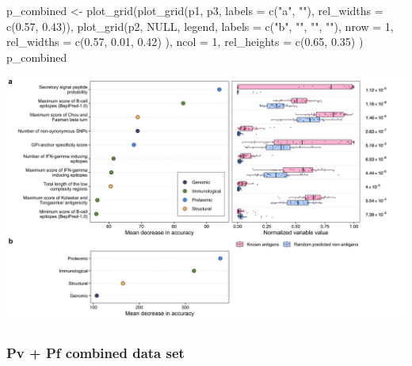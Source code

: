 \documentclass[
  11pt,
  oneside]{book}
\newenvironment{Shaded}{\begin{snugshade}}{\end{snugshade}}
\newcommand{\AttributeTok}[1]{\textcolor[rgb]{0.77,0.63,0.00}{#1}}
\newcommand{\ConstantTok}[1]{\textcolor[rgb]{0.00,0.00,0.00}{#1}}
\newcommand{\DecValTok}[1]{\textcolor[rgb]{0.00,0.00,0.81}{#1}}
\newcommand{\FloatTok}[1]{\textcolor[rgb]{0.00,0.00,0.81}{#1}}
\newcommand{\FunctionTok}[1]{\textcolor[rgb]{0.00,0.00,0.00}{#1}}
\newcommand{\NormalTok}[1]{#1}
\newcommand{\OtherTok}[1]{\textcolor[rgb]{0.56,0.35,0.01}{#1}}
\newcommand{\StringTok}[1]{\textcolor[rgb]{0.31,0.60,0.02}{#1}}
\begin{document}
\begin{Shaded}
\begin{Highlighting}[]
\NormalTok{p\_combined }\OtherTok{\textless{}{-}} \FunctionTok{plot\_grid}\NormalTok{(}\FunctionTok{plot\_grid}\NormalTok{(p1, p3, }\AttributeTok{labels =} \FunctionTok{c}\NormalTok{(}\StringTok{"a"}\NormalTok{, }\StringTok{""}\NormalTok{), }\AttributeTok{rel\_widths =} \FunctionTok{c}\NormalTok{(}\FloatTok{0.57}\NormalTok{, }\FloatTok{0.43}\NormalTok{)),}
  \FunctionTok{plot\_grid}\NormalTok{(p2, }\ConstantTok{NULL}\NormalTok{, legend,}
    \AttributeTok{labels =} \FunctionTok{c}\NormalTok{(}\StringTok{"b"}\NormalTok{, }\StringTok{""}\NormalTok{, }\StringTok{""}\NormalTok{, }\StringTok{""}\NormalTok{),}
    \AttributeTok{nrow =} \DecValTok{1}\NormalTok{, }\AttributeTok{rel\_widths =} \FunctionTok{c}\NormalTok{(}\FloatTok{0.57}\NormalTok{, }\FloatTok{0.01}\NormalTok{, }\FloatTok{0.42}\NormalTok{)}
\NormalTok{  ),}
  \AttributeTok{ncol =} \DecValTok{1}\NormalTok{, }\AttributeTok{rel\_heights =} \FunctionTok{c}\NormalTok{(}\FloatTok{0.65}\NormalTok{, }\FloatTok{0.35}\NormalTok{)}
\NormalTok{)}
\NormalTok{p\_combined}
\end{Highlighting}
\end{Shaded}

\begin{center}\includegraphics[width=1\linewidth]{./figures/Supplementary Fig 9} \end{center}

\hypertarget{pv-pf-combined-data-set-6}{%
\subsubsection{Pv + Pf combined data set}\label{pv-pf-combined-data-set-6}}
\end{document}
